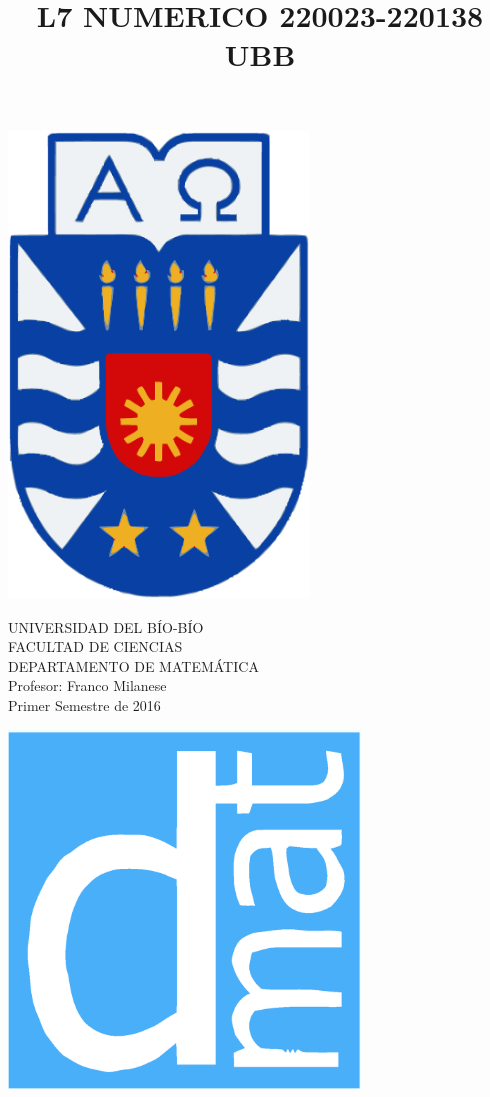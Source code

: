 \documentclass[11pt]{article}
\begin{document}
\title{L7 NUMERICO 220023-220138 UBB}

{\begin{minipage}{2cm}
\hspace*{1cm}\includegraphics[width=0.6\textwidth]{escubo-ubb.eps}
\end{minipage}
\begin{minipage}{12cm}
\small
{\bf \rm 
{
\begin{center}
{\footnotesize UNIVERSIDAD DEL B\'IO-B\'IO} \\
{\scriptsize FACULTAD DE CIENCIAS}  \\
{\scriptsize DEPARTAMENTO DE MATEM\'ATICA}  \\
{\scriptsize Profesor:  Franco Milanese}\\
{\scriptsize Primer Semestre de 2016}
\end{center}
}}
\end{minipage}}
{\begin{minipage}{2cm}
\hspace*{-0.5cm}\vspace*{-0.05cm}\includegraphics[width=0.7\textwidth]{escudo-dmat.eps}
\end{minipage}}
\end{document}
